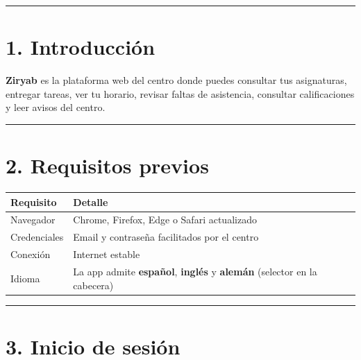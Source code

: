 \documentclass[
  spanish,
  11pt,
]{report}
\newcounter{none} %
\begin{document}
\begin{center}\rule{0.5\linewidth}{0.5pt}\end{center}

\section{1. Introducción}\label{introducciuxf3n}

\textbf{Ziryab} es la plataforma web del centro donde puedes consultar
tus asignaturas, entregar tareas, ver tu horario, revisar faltas de
asistencia, consultar calificaciones y leer avisos del centro.

\begin{center}\rule{0.5\linewidth}{0.5pt}\end{center}

\section{2. Requisitos previos}\label{requisitos-previos}

{\def\LTcaptype{none} %
\begin{longtable}[]{@{}
  >{\raggedright\arraybackslash}p{}
  >{\raggedright\arraybackslash}p{}@{}}
\toprule\noalign{}
\begin{minipage}[b]{\linewidth}\raggedright
Requisito
\end{minipage} & \begin{minipage}[b]{\linewidth}\raggedright
Detalle
\end{minipage} \\
\midrule\noalign{}
\endhead
\bottomrule\noalign{}
\endlastfoot
Navegador & Chrome, Firefox, Edge o Safari actualizado \\
Credenciales & Email y contraseña facilitados por el centro \\
Conexión & Internet estable \\
Idioma & La app admite \textbf{español}, \textbf{inglés} y
\textbf{alemán} (selector en la cabecera) \\
\end{longtable}
}

\begin{center}\rule{0.5\linewidth}{0.5pt}\end{center}

\section{3. Inicio de sesión}\label{inicio-de-sesiuxf3n}
\end{document}
